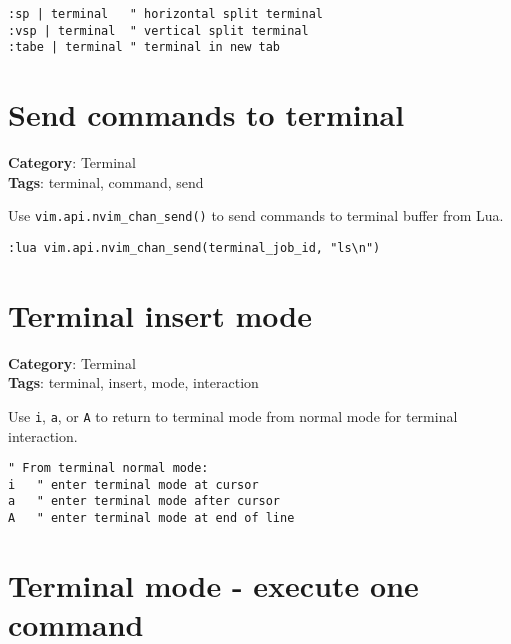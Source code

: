 {{{{{{{{{{{{{\begin{Exa*}{}
\begin{Verbatim}[fontsize=\footnotesize, breaklines, breakanywhere]
:sp | terminal   " horizontal split terminal
:vsp | terminal  " vertical split terminal  
:tabe | terminal " terminal in new tab
\end{Verbatim}
\end{Exa*}

\section{Send commands to terminal}

\textbf{Category}: Terminal\\ \textbf{Tags}: terminal, command, send
\vspace{0.5cm}

Use {\footnotesize \Verb§vim.api.nvim_chan_send()§} to send commands to terminal buffer from Lua.

\begin{Exa*}{}
\begin{Verbatim}[fontsize=\footnotesize, breaklines, breakanywhere]
:lua vim.api.nvim_chan_send(terminal_job_id, "ls\n")
\end{Verbatim}
\end{Exa*}

\section{Terminal insert mode}

\textbf{Category}: Terminal\\ \textbf{Tags}: terminal, insert, mode, interaction
\vspace{0.5cm}

Use {\footnotesize \Verb§i§}, {\footnotesize \Verb§a§}, or {\footnotesize \Verb§A§} to return to terminal mode from normal mode for terminal interaction.

\begin{Exa*}{}
\begin{Verbatim}[fontsize=\footnotesize, breaklines, breakanywhere]
" From terminal normal mode:
i   " enter terminal mode at cursor
a   " enter terminal mode after cursor  
A   " enter terminal mode at end of line
\end{Verbatim}
\end{Exa*}

\section{Terminal mode - execute one command}

}}}}}}}}}}}}}
